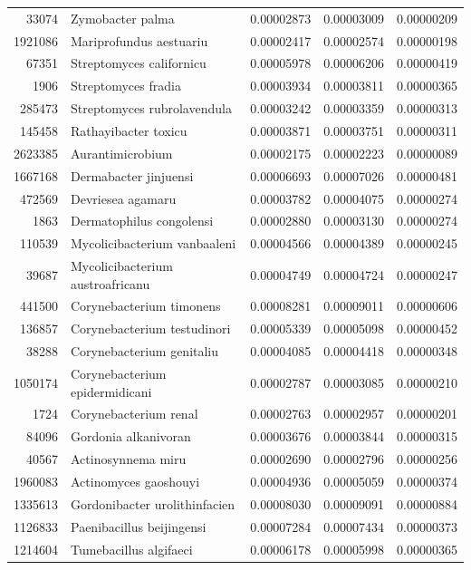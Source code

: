 \begin{table}[ht]
\begin{tabular}{rlrrr}
  33074 & Zymobacter palma & 0.00002873 & 0.00003009 & 0.00000209 \\ 
  1921086 & Mariprofundus aestuariu & 0.00002417 & 0.00002574 & 0.00000198 \\ 
  67351 & Streptomyces californicu & 0.00005978 & 0.00006206 & 0.00000419 \\ 
  1906 & Streptomyces fradia & 0.00003934 & 0.00003811 & 0.00000365 \\ 
  285473 & Streptomyces rubrolavendula & 0.00003242 & 0.00003359 & 0.00000313 \\ 
  145458 & Rathayibacter toxicu & 0.00003871 & 0.00003751 & 0.00000311 \\ 
  2623385 & Aurantimicrobium & 0.00002175 & 0.00002223 & 0.00000089 \\ 
  1667168 & Dermabacter jinjuensi & 0.00006693 & 0.00007026 & 0.00000481 \\ 
  472569 & Devriesea agamaru & 0.00003782 & 0.00004075 & 0.00000274 \\ 
  1863 & Dermatophilus congolensi & 0.00002880 & 0.00003130 & 0.00000274 \\ 
  110539 & Mycolicibacterium vanbaaleni & 0.00004566 & 0.00004389 & 0.00000245 \\ 
  39687 & Mycolicibacterium austroafricanu & 0.00004749 & 0.00004724 & 0.00000247 \\ 
  441500 & Corynebacterium timonens & 0.00008281 & 0.00009011 & 0.00000606 \\ 
  136857 & Corynebacterium testudinori & 0.00005339 & 0.00005098 & 0.00000452 \\ 
  38288 & Corynebacterium genitaliu & 0.00004085 & 0.00004418 & 0.00000348 \\ 
  1050174 & Corynebacterium epidermidicani & 0.00002787 & 0.00003085 & 0.00000210 \\ 
  1724 & Corynebacterium renal & 0.00002763 & 0.00002957 & 0.00000201 \\ 
  84096 & Gordonia alkanivoran & 0.00003676 & 0.00003844 & 0.00000315 \\ 
  40567 & Actinosynnema miru & 0.00002690 & 0.00002796 & 0.00000256 \\ 
  1960083 & Actinomyces gaoshouyi & 0.00004936 & 0.00005059 & 0.00000374 \\ 
  1335613 & Gordonibacter urolithinfacien & 0.00008030 & 0.00009091 & 0.00000884 \\ 
  1126833 & Paenibacillus beijingensi & 0.00007284 & 0.00007434 & 0.00000373 \\ 
  1214604 & Tumebacillus algifaeci & 0.00006178 & 0.00005998 & 0.00000365 \\ 

\end{tabular}
\end{table}
